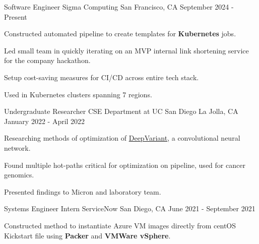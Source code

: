 \begin{cventries}
  \cventry
    {Software Engineer}
    {Sigma Computing}
    {San Francisco, CA}
    {September 2024 - Present}
    {
      \begin{cvitems}
        \item {Constructed automated pipeline to create templates for \textbf{Kubernetes} jobs.}
        \item {Led small team in quickly iterating on an MVP internal link shortening service for the company hackathon.}
        \item {Setup cost-saving measures for CI/CD across entire tech stack.}
        \item {Used in Kubernetes clusters spanning 7 regions.}
      \end{cvitems}
    }
  \cventry
    {Undergraduate Researcher}
    {CSE Department at UC San Diego}
    {La Jolla, CA}
    {January 2022 - April 2022}
    {
      \begin{cvitems}
        \item {Researching methods of optimization of \href{https://github.com/google/deepvariant}{DeepVariant}, a convolutional neural network.}
        \item {Found multiple hot-paths critical for optimization on pipeline, used for cancer genomics.}
        \item {Presented findings to Micron and laboratory team.}
      \end{cvitems}
    }
  \cventry
    {Systems Engineer Intern}
    {ServiceNow}
    {San Diego, CA}
    {June 2021 - September 2021}
    {
      \begin{cvitems}
        \item {Constructed method to instantiate Azure VM images directly from centOS Kickstart file using \textbf{Packer} and \textbf{VMWare vSphere}.}

\end{cvitems}}
\end{cventries}
